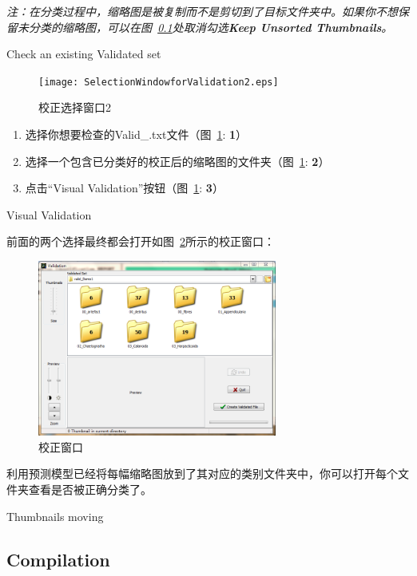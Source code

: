 \documentclass[12pt]{article}
\begin{document}
{\color{blue}\textit{注：在分类过程中，缩略图是被复制而不是剪切到了目标文件夹中。如果你不想保留未分类的缩略图，可以在图~\ref{}处取消勾选\textbf{Keep Unsorted Thumbnails}。}}

{\color{red}Check an existing Validated set}

\begin{figure}[!ht]
\centering
\texttt{[image: SelectionWindowforValidation2.eps]}
\caption{校正选择窗口2}
\label{fig: SelectionWindowforValidation2}
\end{figure}

\begin{enumerate}
\item 选择你想要检查的Valid\_.txt文件（图~\ref{fig: SelectionWindowforValidation2}: {\color{red}\textbf{1}}）
\item 选择一个包含已分类好的校正后的缩略图的文件夹（图~\ref{fig: SelectionWindowforValidation2}: {\color{red}\textbf{2}}）
\item 点击“Visual Validation”按钮（图~\ref{fig: SelectionWindowforValidation2}: {\color{red}\textbf{3}}）
\end{enumerate}

{\color{red}Visual Validation}

前面的两个选择最终都会打开如图~\ref{fig: ValidationWindow2}所示的校正窗口：

\begin{figure}[!ht]
\centering
\includegraphics[width=0.7\textwidth]{ValidationWindow2.png}
\caption{校正窗口}
\label{fig: ValidationWindow2}
\end{figure}

利用预测模型已经将每幅缩略图放到了其对应的类别文件夹中，你可以打开每个文件夹查看是否被正确分类了。

{\color{red}Thumbnails moving}

\subsection{Compilation}
\end{document}
